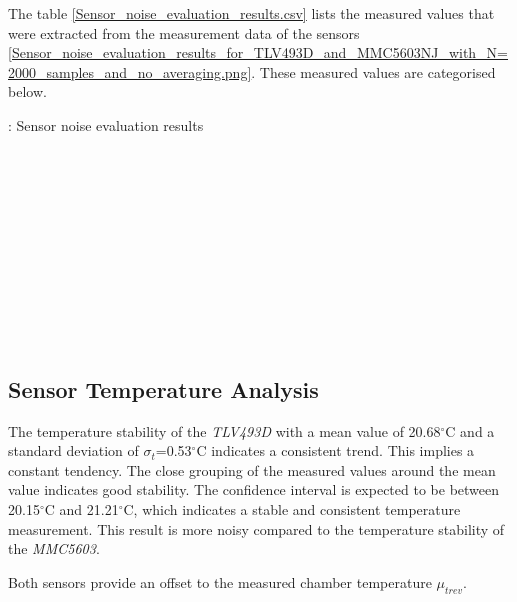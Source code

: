 The table \ref{Sensor_noise_evaluation_results.csv} lists the measured
values that were extracted from the measurement data of the sensors
\ref{Sensor_noise_evaluation_results_for_TLV493D_and_MMC5603NJ_with_N=2000_samples_and_no_averaging.png}.
These measured values are categorised below.

: Sensor noise evaluation results
\label{Sensor_noise_evaluation_results.csv}

~\textbar{}\\
\hspace*{0.333em}\textbar{}\\
\hspace*{0.333em}\textbar{}\\
\hspace*{0.333em}\textbar{}\\
\hspace*{0.333em}\textbar{}\\
\hspace*{0.333em}\textbar{}\\
\hspace*{0.333em}\textbar{}\\
\hspace*{0.333em}\textbar{}\\
\hspace*{0.333em}\textbar{}\\
\hspace*{0.333em}\textbar{}\\
\hspace*{0.333em}\textbar{}

\hypertarget{sensor-temperature-analysis}{%
\subsection{Sensor Temperature
Analysis}\label{sensor-temperature-analysis}}

The temperature stability of the \emph{TLV493D} with a mean value of
20.68\(^{\circ}\)C and a standard deviation of
\(\sigma_{t}\)=0.53\(^{\circ}\)C indicates a consistent trend. This
implies a constant tendency. The close grouping of the measured values
around the mean value indicates good stability. The confidence interval
is expected to be between 20.15\(^{\circ}\)C and 21.21\(^{\circ}\)C,
which indicates a stable and consistent temperature measurement. This
result is more noisy compared to the temperature stability of the
\emph{MMC5603}.

Both sensors provide an offset to the measured chamber temperature
\(\mu_{trev}\).

